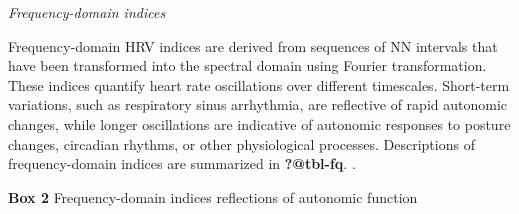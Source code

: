 \documentclass[
  a4paper,
  headsepline=true,
  open=any]{scrbook}
\begin{document}
\emph{Frequency-domain indices}

Frequency-domain HRV indices are derived from sequences of NN intervals
that have been transformed into the spectral domain using Fourier
transformation. These indices quantify heart rate oscillations over
different timescales. Short-term variations, such as respiratory sinus
arrhythmia, are reflective of rapid autonomic changes, while longer
oscillations are indicative of autonomic responses to posture changes,
circadian rhythms, or other physiological processes. Descriptions of
frequency-domain indices are summarized in \textbf{?@tbl-fq}. .

\begin{table}

\caption{\textbf{Box 2} Frequency-domain indices reflections of
autonomic function}\begin{minipage}[t]{\linewidth}

{\centering 

}
\end{minipage}
\end{table}
\end{document}
